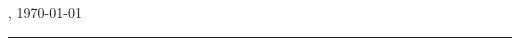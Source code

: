 \thispagestyle{empty}

\section*{\langstatementofauthorship}

\langstatementofauthorshiptext

\ifincludeDigitalSubmission
\vspace{1em}
\langdigitalsubmissiontext
\fi

\vfill

\mysubmissionLocation, \today
\vspace{4em}

\rule{6cm}{0.4pt}\\
\myauthor

